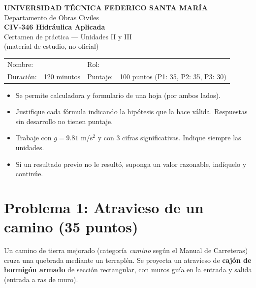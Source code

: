 \documentclass[11pt,letterpaper]{article}
\begin{document}
\begin{center}
{\large\bfseries UNIVERSIDAD TÉCNICA FEDERICO SANTA MARÍA}\\[2pt]
Departamento de Obras Civiles\\[8pt]
{\Large\bfseries\color{azulusm} CIV-346 Hidráulica Aplicada}\\[4pt]
{\large Certamen de práctica --- Unidades II y III}\\[2pt]
{\small (material de estudio, no oficial)}
\end{center}

\noindent
\begin{tabularx}{\textwidth}{@{}lX lX@{}}
Nombre: & \hrulefill & Rol: & \hrulefill\\
Duración: & 120 minutos & Puntaje: & 100 puntos (P1: 35, P2: 35, P3: 30)\\
\end{tabularx}

\begin{dato}[title=Instrucciones]
\begin{itemize}[leftmargin=*,noitemsep]
\item Se permite calculadora y formulario de una hoja (por ambos lados).
\item Justifique cada fórmula indicando la hipótesis que la hace válida. Respuestas sin desarrollo no tienen puntaje.
\item Trabaje con $g=9.81$ m/s$^2$ y con 3 cifras significativas. Indique siempre las unidades.
\item Si un resultado previo no le resultó, suponga un valor razonable, indíquelo y continúe.
\end{itemize}
\end{dato}

\section*{Problema 1: Atravieso de un camino (35 puntos)}

Un camino de tierra mejorado (categoría \emph{camino} según el Manual de Carreteras) cruza una
quebrada mediante un terraplén. Se proyecta un atravieso de \textbf{cajón de hormigón armado}
de sección rectangular, con muros guía en la entrada y salida (entrada a ras de muro).
\end{document}
